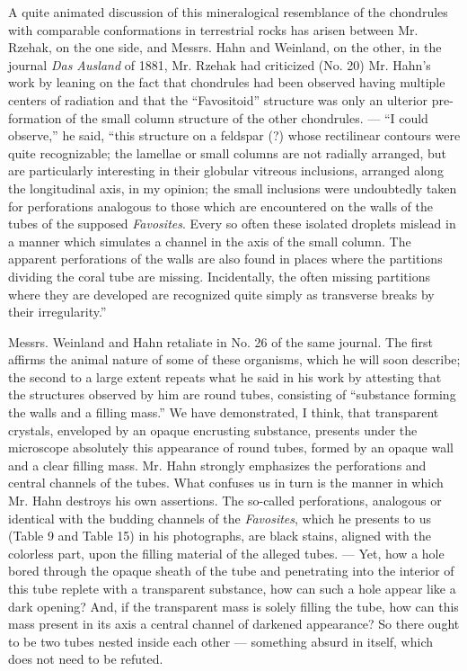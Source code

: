 \documentclass[a4paper, 12pt, oneside]{article}
\begin{document}
A quite animated discussion of this mineralogical resemblance of the chondrules with comparable conformations in terrestrial rocks has arisen between Mr. Rzehak, on the one side, and Messrs. Hahn and Weinland, on the other, in the journal \emph{Das Ausland} of 1881, Mr. Rzehak had criticized (No. 20) Mr. Hahn's work by leaning on the fact that chondrules had been observed having multiple centers of radiation and that the ``Favositoid'' structure was only an ulterior pre-formation of the small column structure of the other chondrules. --- ``I could observe,'' he said, ``this structure on a feldspar (?) whose rectilinear contours were quite recognizable; the lamellae or small columns are not radially arranged, but are particularly interesting in their globular vitreous inclusions, arranged along the longitudinal axis, in my opinion; the small inclusions were undoubtedly taken for perforations analogous to those which are encountered on the walls of the tubes of the supposed \emph{Favosites}. Every so often these isolated droplets mislead in a manner which simulates a channel in the axis of the small column. The apparent perforations of the walls are also found in places where the partitions dividing the coral tube are missing. Incidentally, the often missing partitions where they are developed are recognized quite simply as transverse breaks by their irregularity.''

Messrs. Weinland and Hahn retaliate in No. 26 of the same journal. The first affirms the animal nature of some of these organisms, which he will soon describe; the second to a large extent repeats what he said in his work by attesting that the structures observed by him are round tubes, consisting of ``substance forming the walls and a filling mass.'' We have demonstrated, I think, that transparent crystals, enveloped by an opaque encrusting substance, presents under the microscope absolutely this appearance of round tubes, formed by an opaque wall and a clear filling mass. Mr. Hahn strongly emphasizes the perforations and central channels of the tubes. What confuses us in turn is the manner in which Mr. Hahn destroys his own assertions. The so-called perforations, analogous or identical with the budding channels of the \emph{Favosites}, which he presents to us (Table 9 and Table 15) in his photographs, are black stains, aligned with the colorless part, upon the filling material of the alleged tubes. --- Yet, how a hole bored through the opaque sheath of the tube and penetrating into the interior of this tube replete with a transparent substance, how can such a hole appear like a dark opening? And, if the transparent mass is solely filling the tube, how can this mass present in its axis a central channel of darkened appearance? So there ought to be two tubes nested inside each other --- something absurd in itself, which does not need to be refuted.
\end{document}
